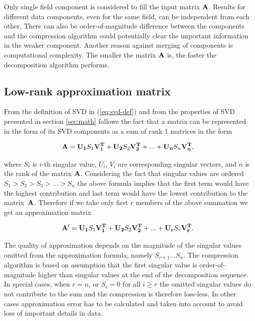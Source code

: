 
Only single field component is considered to fill the input matrix $\mathbf{A}$. Results for different data components, even for the same field, can be independent from each other. There can also be order-of-magnitude difference between the components and the compression algorithm could potentially clear the important information in the weaker component. Another reason against merging of components is computational complexity. The smaller the matrix $\mathbf{A}$ is, the faster the decomposition algorithm performs.

\subsection{Low-rank approximation matrix}

From the definition of SVD in (\ref{eq:svd-def}) and from the properties of SVD presented in section \ref{sec:math} follows the fact that a matrix can be represented in the form of its SVD components as a sum of rank 1 matrices in the form

\begin{equation}
\mathbf{A}=\mathbf{U_{1}}S_{1}\mathbf{V_{1}^{T}}+\mathbf{U_{2}}S_{2}\mathbf{V_{2}^{T}}+ ... +\mathbf{U_{n}}S_{n}\mathbf{V_{n}^{T}},
\label{eq:svd-expansion}
\end{equation}

where $S_{i}$ is $i$-th singular value, $U_{i}$, $V_{i}$ are corresponding singular vectors, and $n$ is the rank of the matrix $\mathbf{A}$. Considering the fact that singular values are ordered $S_{1}>S_{2}>S_{3}> ... >S_{n}$ the above formula implies that the first term would have the highest contribution and last term would have the lowest contribution to the matrix~$\mathbf{A}$. Therefore if we take only first $r$ members of the above summation we get an approximation matrix

\begin{equation}
\mathbf{A'}=\mathbf{U_{1}}S_{1}\mathbf{V_{1}^{T}}+\mathbf{U_{2}}S_{2}\mathbf{V_{2}^{T}}+ ... +\mathbf{U_{r}}S_{r}\mathbf{V_{r}^{T}}.
\label{eq:svd-approx-expansion}
\end{equation}

The quality of approximation depends on the magnitude of the singular values omitted from the approximation formula, namely $S_{r+1} ...  S_{n}$. The compression algorithm is based on assumption that the first singular value is order-of-magnitude higher than singular values at the end of the decomposition sequence. In special cases, when $r=n$, or $S_{i}=0$ for all $i \geq r$ the omitted singular values do not contribute to the sum and the compression is therefore loss-less. In other cases approximation error has to be calculated and taken into account to avoid loss of important details in data.

